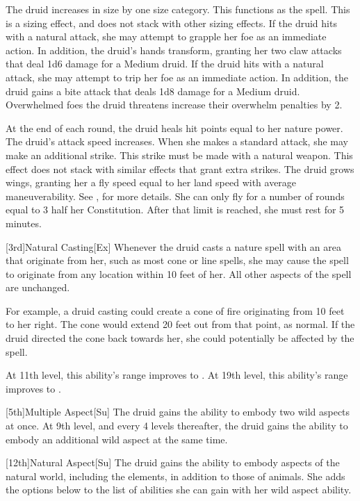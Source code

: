The druid increases in size by one size category.
This functions as the  spell.
This is a sizing effect, and does not stack with other sizing effects.
If the druid hits with a natural attack, she may attempt to grapple her foe as an immediate action.
In addition, the druid's hands transform, granting her two claw attacks that deal 1d6 damage for a Medium druid.
If the druid hits with a natural attack, she may attempt to trip her foe as an immediate action.
In addition, the druid gains a bite attack that deals 1d8 damage for a Medium druid.
Overwhelmed foes the druid threatens increase their overwhelm penalties by 2.

At the end of each round, the druid heals hit points equal to her nature power.
The druid's attack speed increases.
When she makes a standard attack, she may make an additional strike.
This strike must be made with a natural weapon.
This effect does not stack with similar effects that grant extra strikes.
The druid grows wings, granting her a fly speed equal to her land speed with average maneuverability.
See , for more details.
She can only fly for a number of rounds equal to 3 \add half her Constitution.
After that limit is reached, she must rest for 5 minutes.

[3rd]{Natural Casting}[Ex]
Whenever the druid casts a nature spell with an area that originate from her, such as most cone or line spells, she may cause the spell to originate from any location within 10 feet of her.
All other aspects of the spell are unchanged.

For example, a druid casting  could create a cone of fire originating from 10 feet to her right.
The cone would extend 20 feet out from that point, as normal.
If the druid directed the cone back towards her, she could potentially be affected by the spell.

At 11th level, this ability's range improves to \rngclose.
At 19th level, this ability's range improves to \rngmed.

[5th]{Multiple Aspect}[Su]
The druid gains the ability to embody two wild aspects at once.
At 9th level, and every 4 levels thereafter, the druid gains the ability to embody an additional wild aspect at the same time.

[12th]{Natural Aspect}[Su]
The druid gains the ability to embody aspects of the natural world, including the elements, in addition to those of animals.
She adds the options below to the list of abilities she can gain with her wild aspect ability.

